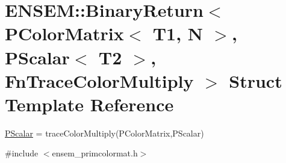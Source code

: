\hypertarget{structENSEM_1_1BinaryReturn_3_01PColorMatrix_3_01T1_00_01N_01_4_00_01PScalar_3_01T2_01_4_00_01FnTraceColorMultiply_01_4}{}\section{E\+N\+S\+EM\+:\+:Binary\+Return$<$ P\+Color\+Matrix$<$ T1, N $>$, P\+Scalar$<$ T2 $>$, Fn\+Trace\+Color\+Multiply $>$ Struct Template Reference}
\label{structENSEM_1_1BinaryReturn_3_01PColorMatrix_3_01T1_00_01N_01_4_00_01PScalar_3_01T2_01_4_00_01FnTraceColorMultiply_01_4}


\mbox{\hyperlink{classENSEM_1_1PScalar}{P\+Scalar}} = trace\+Color\+Multiply(\+P\+Color\+Matrix,\+P\+Scalar)  




{\ttfamily \#include $<$ensem\+\_\+primcolormat.\+h$>$}

